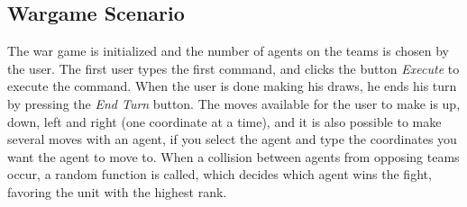 \subsection{Wargame Scenario}

The war game is initialized and the number of agents on the teams is chosen by the user. The first user types the first command, and clicks the button \textit{Execute} to execute the command. When the user is done making his draws, he ends his turn by pressing the \textit{End Turn} button.
   The moves available for the user to make is up, down, left and right (one coordinate at a time), and it is also possible to make several moves with an agent, if you select the agent and type the coordinates you want the agent to move to.
   When a collision between agents from opposing teams occur, a random function is called, which decides which agent wins the fight, favoring the unit with the highest rank.